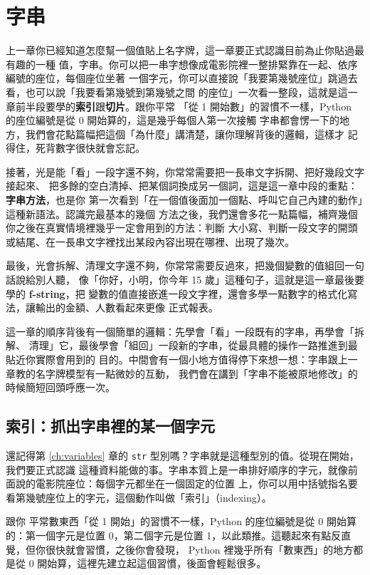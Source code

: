 \chapter{字串}
\label{ch:strings}

上一章你已經知道怎麼幫一個值貼上名字牌，這一章要正式認識目前為止你貼過最有趣的一種
值，字串。你可以把一串字想像成電影院裡一整排緊靠在一起、依序編號的座位，每個座位坐著
一個字元，你可以直接說「我要第幾號座位」跳過去看，也可以說「我要看第幾號到第幾號之間
的座位」一次看一整段，這就是這一章前半段要學的\textbf{索引}跟\textbf{切片}。跟你平常
「從 1 開始數」的習慣不一樣，Python 的座位編號是從 0 開始算的，這是幾乎每個人第一次接觸
字串都會愣一下的地方，我們會花點篇幅把這個「為什麼」講清楚，讓你理解背後的邏輯，這樣才
記得住，死背數字很快就會忘記。

接著，光是能「看」一段字還不夠，你常常需要把一長串文字拆開、把好幾段文字接起來、
把多餘的空白清掉、把某個詞換成另一個詞，這是這一章中段的重點：\textbf{字串方法}，也是你
第一次看到「在一個值後面加一個點、呼叫它自己內建的動作」這種新語法。認識完最基本的幾個
方法之後，我們還會多花一點篇幅，補齊幾個你之後在真實情境裡幾乎一定會用到的方法：判斷
大小寫、判斷一段文字的開頭或結尾、在一長串文字裡找出某段內容出現在哪裡、出現了幾次。

最後，光會拆解、清理文字還不夠，你常常需要反過來，把幾個變數的值組回一句話說給別人聽，
像「你好，小明，你今年 15 歲」這種句子，這就是這一章最後要學的 \textbf{f-string}，把
變數的值直接嵌進一段文字裡，還會多學一點數字的格式化寫法，讓輸出的金額、人數看起來更像
正式報表。

這一章的順序背後有一個簡單的邏輯：先學會「看」一段既有的字串，再學會「拆解、
清理」它，最後學會「組回」一段新的字串，從最具體的操作一路推進到最貼近你實際會用到的
目的。中間會有一個小地方值得停下來想一想：字串跟上一章教的名字牌模型有一點微妙的互動，
我們會在講到「字串不能被原地修改」的時候簡短回頭呼應一次。

\section{索引：抓出字串裡的某一個字元}
\label{sec:string-indexing}

還記得第 \ref{ch:variables} 章的 \texttt{str} 型別嗎？字串就是這種型別的值。從現在開始，我們要正式認識
這種資料能做的事。字串本質上是一串排好順序的字元，就像前面說的電影院座位：每個字元都坐在一個固定的位置
上，你可以用中括號指名要看第幾號座位上的字元，這個動作叫做「索引」（indexing）。

跟你
平常數東西「從 1 開始」的習慣不一樣，Python 的座位編號是從 0 開始算的：第一個字元是位置
0，第二個字元是位置 1，以此類推。這聽起來有點反直覺，但你很快就會習慣，之後你會發現，
Python 裡幾乎所有「數東西」的地方都是從 0 開始算，這裡先建立起這個習慣，後面會輕鬆很多。

